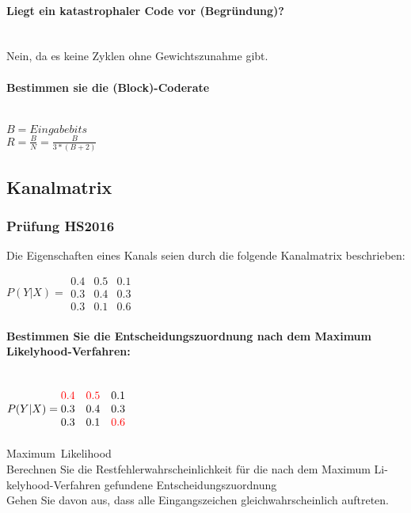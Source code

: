 \paragraph{Liegt ein katastrophaler Code vor (Begründung)?}\mbox{}\\
Nein, da es keine Zyklen ohne Gewichtszunahme gibt.

\paragraph{Bestimmen sie die (Block)-Coderate}\mbox{}\\
$B=Eingabebits$\\
$R=\frac{B}{N} = \frac{B}{3*(B+2)}$



\subsection{Kanalmatrix}
\subsubsection{Prüfung HS2016}
Die Eigenschaften eines Kanals seien durch die folgende Kanalmatrix beschrieben: 

$P(Y|X) = \begin{matrix}
    0.4 & 0.5 & 0.1\\
    0.3 & 0.4 & 0.3\\
    0.3 & 0.1 & 0.6
\end{matrix}$

\paragraph{Bestimmen Sie die Entscheidungszuordnung nach dem Maximum Likelyhood-Verfahren:}\mbox{}\\
$P(Y|X) = \begin{matrix}
    \textcolor{red}{0.4} & \textcolor{red}{0.5} & 0.1\\
    0.3 & 0.4 & 0.3\\
    0.3 & 0.1 & \textcolor{red}{0.6}
\end{matrix}$

\paragraph{}\mbox{Maximum Likelihood}\\
Berechnen Sie die Restfehlerwahrscheinlichkeit für die nach dem Maximum Li-kelyhood-Verfahren gefundene Entscheidungszuordnung\\
Gehen Sie davon aus, dass alle Eingangszeichen gleichwahrscheinlich auftreten.\\

